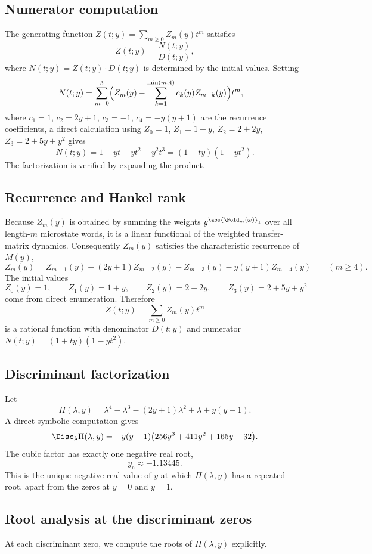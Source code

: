 \subsection{Numerator computation}
The generating function \(Z(t;y)=\sum_{m\ge 0}Z_m(y)t^m\) satisfies
\[
Z(t;y)=\frac{N(t;y)}{D(t;y)},
\]
where \(N(t;y)=Z(t;y)\cdot D(t;y)\) is determined by the initial values. Setting
\[
\begin{aligned}
N(t;y)
&=\sum_{m=0}^{3}
\Bigl(
Z_m(y)-\sum_{k=1}^{\min(m,4)}c_k(y)Z_{m-k}(y)
\Bigr)t^m,
\end{aligned}
\]
where \(c_1=1\), \(c_2=2y+1\), \(c_3=-1\), \(c_4=-y(y+1)\) are the recurrence coefficients, a direct calculation using \(Z_0=1\), \(Z_1=1+y\), \(Z_2=2+2y\), \(Z_3=2+5y+y^2\) gives
\[
N(t;y)=1+yt-yt^2-y^2t^3=(1+ty)(1-yt^2).
\]
The factorization is verified by expanding the product.

\subsection{Recurrence and Hankel rank}
Because \(Z_m(y)\) is obtained by summing the weights \(y^{\abs{\Fold_m(\omega)}_1}\) over all length-\(m\) microstate words, it is a linear functional of the weighted transfer-matrix dynamics. Consequently \(Z_m(y)\) satisfies the characteristic recurrence of \(M(y)\),
\[
Z_m(y)=Z_{m-1}(y)+(2y+1)Z_{m-2}(y)-Z_{m-3}(y)-y(y+1)Z_{m-4}(y)
\qquad (m\ge 4).
\]
The initial values
\[
Z_0(y)=1,\qquad
Z_1(y)=1+y,\qquad
Z_2(y)=2+2y,\qquad
Z_3(y)=2+5y+y^2
\]
come from direct enumeration. Therefore
\[
Z(t;y)=\sum_{m\ge0}Z_m(y)t^m
\]
is a rational function with denominator \(D(t;y)\) and numerator \(N(t;y)=(1+ty)(1-yt^2)\).

\subsection{Discriminant factorization}
Let
\[
\Pi(\lambda,y)=\lambda^4-\lambda^3-(2y+1)\lambda^2+\lambda+y(y+1).
\]
A direct symbolic computation gives
\[
\Disc_\lambda \Pi(\lambda,y)
=-y(y-1)\bigl(256y^3+411y^2+165y+32\bigr).
\]
The cubic factor has exactly one negative real root,
\[
y_{\mathrm{c}}\approx -1.13445.
\]
This is the unique negative real value of \(y\) at which \(\Pi(\lambda,y)\) has a repeated root, apart from the zeros at \(y=0\) and \(y=1\).

\subsection{Root analysis at the discriminant zeros}
At each discriminant zero, we compute the roots of \(\Pi(\lambda,y)\) explicitly.

